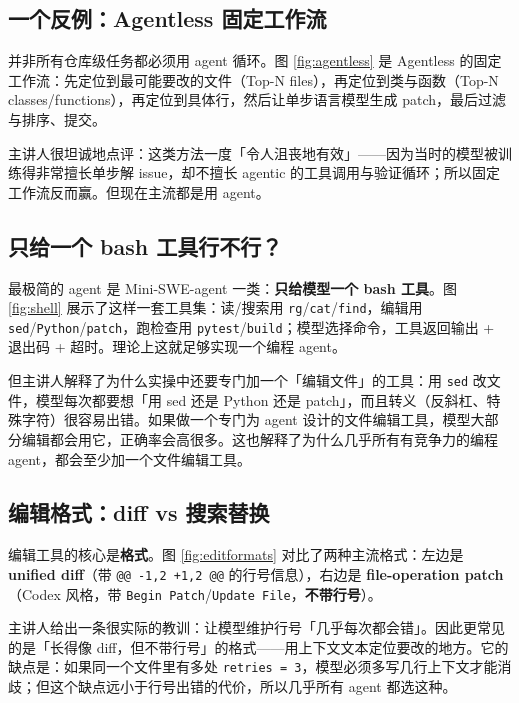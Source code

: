 ﻿\documentclass[a4paper]{article}
\begin{document}
\subsection{一个反例：Agentless 固定工作流}

并非所有仓库级任务都必须用 agent 循环。图 \ref{fig:agentless} 是 Agentless 的固定工作流：先定位到最可能要改的文件（Top-N files），再定位到类与函数（Top-N classes/functions），再定位到具体行，然后让单步语言模型生成 patch，最后过滤与排序、提交。

主讲人很坦诚地点评：这类方法一度「令人沮丧地有效」——因为当时的模型被训练得非常擅长单步解 issue，却不擅长 agentic 的工具调用与验证循环；所以固定工作流反而赢。但现在主流都是用 agent。

\subsection{只给一个 bash 工具行不行？}

最极简的 agent 是 Mini-SWE-agent 一类：\textbf{只给模型一个 bash 工具}。图 \ref{fig:shell} 展示了这样一套工具集：读/搜索用 \texttt{rg}/\texttt{cat}/\texttt{find}，编辑用 \texttt{sed}/\texttt{Python}/\texttt{patch}，跑检查用 \texttt{pytest}/\texttt{build}；模型选择命令，工具返回输出 + 退出码 + 超时。理论上这就足够实现一个编程 agent。

但主讲人解释了为什么实操中还要专门加一个「编辑文件」的工具：用 \texttt{sed} 改文件，模型每次都要想「用 sed 还是 Python 还是 patch」，而且转义（反斜杠、特殊字符）很容易出错。如果做一个专门为 agent 设计的文件编辑工具，模型大部分编辑都会用它，正确率会高很多。这也解释了为什么几乎所有有竞争力的编程 agent，都会至少加一个文件编辑工具。

\subsection{编辑格式：diff vs 搜索替换}

编辑工具的核心是\textbf{格式}。图 \ref{fig:editformats} 对比了两种主流格式：左边是 \textbf{unified diff}（带 \texttt{@@ -1,2 +1,2 @@} 的行号信息），右边是 \textbf{file-operation patch}（Codex 风格，带 \texttt{Begin Patch}/\texttt{Update File}，\textbf{不带行号}）。

主讲人给出一条很实际的教训：让模型维护行号「几乎每次都会错」。因此更常见的是「长得像 diff，但不带行号」的格式——用上下文文本定位要改的地方。它的缺点是：如果同一个文件里有多处 \texttt{retries = 3}，模型必须多写几行上下文才能消歧；但这个缺点远小于行号出错的代价，所以几乎所有 agent 都选这种。
\end{document}
